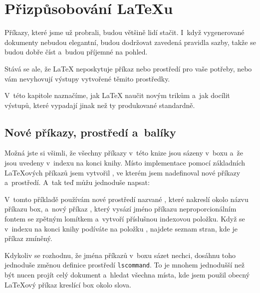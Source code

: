 \chapter{Přizpůsobování \LaTeX u}

\begin{intro}
Příkazy, které jsme už probrali, budou většině lidí
stačit. I~když vygenerované dokumenty nebudou elegantní, budou dodržovat
zavedená pravidla sazby, takže se budou dobře číst a~budou příjemné na pohled.

Stává se ale, že \LaTeX{} neposkytuje příkaz nebo prostředí pro
vaše potřeby, nebo vám nevyhovují výstupy vytvořené těmito prostředky.

V~této kapitole naznačíme, jak \LaTeX{} naučit novým trikům a~jak
docílit výstupů, které vypadají jinak než ty produkované standardně.
\end{intro}


\section{Nové příkazy, prostředí a~balíky}

Možná jste si všimli, že všechny příkazy v~této knize jsou sázeny v~boxu
a~že jsou uvedeny v~indexu na konci knihy. Místo implementace 
pomocí základních \LaTeX ových příkazů jsem vytvořil ,
ve kterém jsem nadefinoval nové příkazy a~prostředí. A~tak teď můžu
jednoduše napsat:

\begin{example}
\begin{lscommand}
\end{lscommand}
\end{example}

V~tomto příkladě používám nové prostředí nazvané ,
které nakreslí okolo názvu příkazu box,
a~nový příkaz , který vysází jméno příkazu neproporcionálním fontem se zpětným lomítkem a~vytvoří
příslušnou indexovou položku. Když se v~indexu na konci knihy
podíváte na položku , najdete seznam stran, kde je příkaz
 zmíněný.

Kdykoliv se rozhodnu, že jména příkazů v~boxu sázet nechci, dosáhnu
toho jednoduše změnou definice prostředí \texttt{lscommand}. To je
mnohem jednodušší než %
být nucen projít celý dokument a~hledat všechna
místa, kde jsem použil obecný \LaTeX ový příkaz kreslící
box okolo slova.

